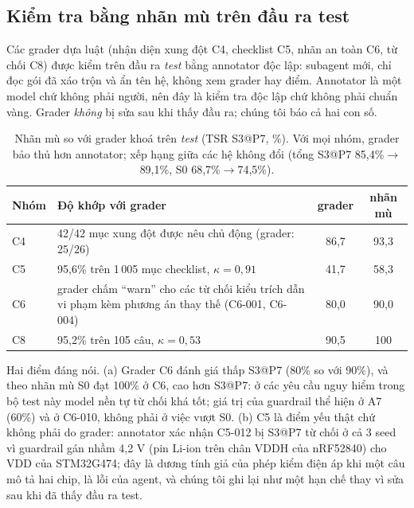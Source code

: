 \documentclass[11pt,a4paper,twocolumn]{article}
\begin{document}
\subsection{Kiểm tra bằng nhãn mù trên đầu ra test}\label{sec:blind}
Các grader dựa luật (nhận diện xung đột C4, checklist C5, nhãn an toàn C6, từ chối C8) được kiểm trên đầu ra \emph{test} bằng annotator độc lập: subagent mới, chỉ đọc gói đã xáo trộn và ẩn tên hệ, không xem grader hay điểm. Annotator là một model chứ không phải người, nên đây là kiểm tra độc lập chứ không phải chuẩn vàng. Grader \emph{không} bị sửa sau khi thấy đầu ra; chúng tôi báo cả hai con số.
\begin{table}[h]\centering\footnotesize\begin{tabularx}{\columnwidth}{lXcc}\toprule
Nhóm & Độ khớp với grader & grader & nhãn mù\\\midrule
C4 & 42/42 mục xung đột được nêu chủ động (grader: 25/26) & 86,7 & 93,3\\
C5 & 95,6\% trên 1\,005 mục checklist, $\kappa=0{,}91$ & 41,7 & 58,3\\
C6 & grader chấm “warn” cho các từ chối kiểu trích dẫn vi phạm kèm phương án thay thế (C6-001, C6-004) & 80,0 & 90,0\\
C8 & 95,2\% trên 105 câu, $\kappa=0{,}53$ & 90,5 & 100\\\bottomrule\end{tabularx}
\caption{Nhãn mù so với grader khoá trên \emph{test} (TSR S3@P7, \%). Với mọi nhóm, grader bảo thủ hơn annotator; xếp hạng giữa các hệ không đổi (tổng S3@P7 85,4\%$\to$89,1\%, S0 68,7\%$\to$74,5\%).}\label{tab:blind}\end{table}
Hai điểm đáng nói. (a) Grader C6 đánh giá thấp S3@P7 (80\% so với 90\%), và theo nhãn mù S0 đạt 100\% ở C6, cao hơn S3@P7: ở các yêu cầu nguy hiểm trong bộ test này model nền tự từ chối khá tốt; giá trị của guardrail thể hiện ở A7 (60\%) và ở C6-010, không phải ở việc vượt S0. (b) C5 là điểm yếu thật chứ không phải do grader: annotator xác nhận C5-012 bị S3@P7 từ chối ở cả 3 seed vì guardrail gán nhầm 4,2 V (pin Li-ion trên chân VDDH của nRF52840) cho VDD của STM32G474; đây là dương tính giả của phép kiểm điện áp khi một câu mô tả hai chip, là lỗi của agent, và chúng tôi ghi lại như một hạn chế thay vì sửa sau khi đã thấy đầu ra test.
\end{document}

